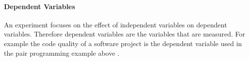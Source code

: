 \paragraph{Dependent Variables}

An experiment focuses on the effect of independent variables on dependent variables. Therefore dependent variables are the variables that are measured. For example the code quality of a software project is the dependent variable used in the pair programming example above . 

